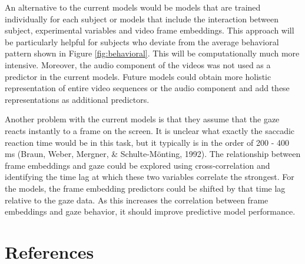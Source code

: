 \documentclass[
  man]{apa6}
\begin{document}
An alternative to the current models would be models that are trained individually for each subject or models that include the interaction between subject, experimental variables and video frame embeddings. This approach will be particularly helpful for subjects who deviate from the average behavioral pattern shown in Figure \ref{fig:behavioral}. This will be computationally much more intensive. Moreover, the audio component of the videos was not used as a predictor in the current models. Future models could obtain more holistic representation of entire video sequences or the audio component and add these representations as additional predictors.

Another problem with the current models is that they assume that the gaze reacts instantly to a frame on the screen. It is unclear what exactly the saccadic reaction time would be in this task, but it typically is in the order of 200 - 400 ms (Braun, Weber, Mergner, \& Schulte-Mönting, 1992). The relationship between frame embeddings and gaze could be explored using cross-correlation and identifying the time lag at which these two variables correlate the strongest. For the models, the frame embedding predictors could be shifted by that time lag relative to the gaze data. As this increases the correlation between frame embeddings and gaze behavior, it should improve predictive model performance.

\newpage

\hypertarget{references}{%
\section{References}\label{references}}
\end{document}

